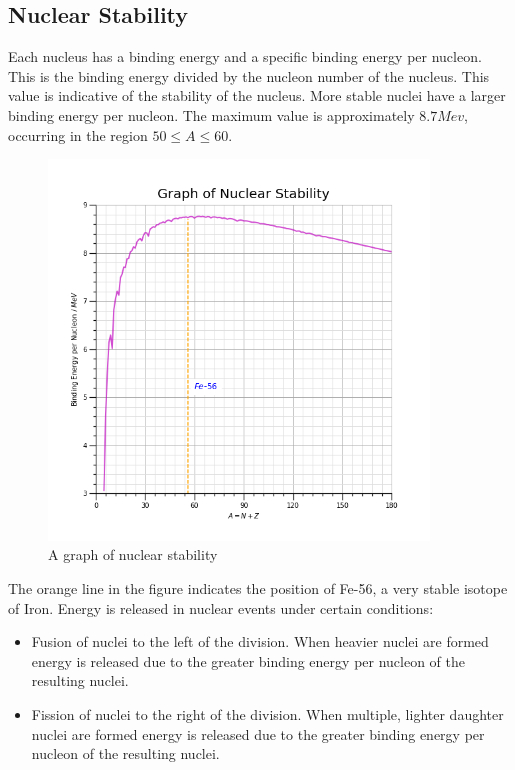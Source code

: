 \documentclass[12pt]{article}
\begin{document}
\subsection{Nuclear Stability}
\label{sec:org2bffd50}

Each nucleus has a binding energy and a specific binding energy per nucleon. This is the binding energy divided by the nucleon number of the nucleus. This value is indicative of the stability of the nucleus. More stable nuclei have a larger binding energy per nucleon. The maximum value is approximately \(8.7Mev\), occurring in the region \(50 \le A \le 60\).

\begin{figure}[H]
\centering
\includegraphics[width=0.9\textwidth,keepaspectratio]{./images/nuclear_stability.png}
\caption{A graph of nuclear stability}
\end{figure}

The orange line in the figure indicates the position of Fe-56, a very stable isotope of Iron. Energy is released in nuclear events under certain conditions:

\begin{itemize}
\item Fusion of nuclei to the left of the division. When heavier nuclei are formed energy is released due to the greater binding energy per nucleon of the resulting nuclei.

\item Fission of nuclei to the right of the division. When multiple, lighter daughter nuclei are formed energy is released due to the greater binding energy per nucleon of the resulting nuclei.
\end{itemize}
\end{document}
